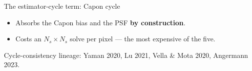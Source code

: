 \documentclass[aspectratio=169,9pt]{beamer}
\begin{document}
\begin{frame}{The estimator-cycle term: Capon cycle}
\begin{center}
  \end{center}
  \vspace{6pt}
  \begin{itemize}
    \item Absorbs the Capon bias and the PSF \textbf{by construction}.
    \item Costs an $N_s\times N_s$ solve per pixel --- the most expensive of the five.
  \end{itemize}
  \vspace{2pt}
  {\scriptsize\color{soft} Cycle-consistency lineage: Yaman 2020, Lu 2021,
   Vella \& Mota 2020, Angermann 2023.\par}
\end{frame}
\end{document}
